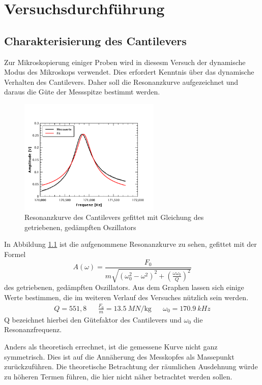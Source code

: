 \chapter{Versuchsdurchführung}

    \section{Charakterisierung des Cantilevers}

Zur Mikroskopierung einiger Proben wird in diesesm Versuch der dynamische Modus des
Mikroskops verwendet. Dies erfordert Kenntnis über das dynamische Verhalten des 
Cantilevers. Daher soll die Resonanzkurve aufgezeichnet und daraus die Güte der
Messspitze bestimmt werden. \par
\begin{figure}[hb]
    \centering
    \includegraphics[width=0.6\textwidth]{Mess/freqsweep_2.pdf}
    \caption{Resonanzkurve des Cantilevers gefittet mit Gleichung des getriebenen,
             gedämpften Oszillators}
    \label{freqsweep}
\end{figure}
In Abbildung \ref{freqsweep} ist die aufgenommene Resonanzkurve zu sehen, gefittet
mit der Formel
\[
    A(\omega) = \frac{F_0}{m \sqrt{(\omega_0^2 - \omega^2)^2 + \left( 
    \frac{\omega\omega_0}{Q} \right)^2} }
\]
des getriebenen, gedämpften Oszillators. Aus dem Graphen lassen sich einige Werte
bestimmen, die im weiteren Verlauf des Versuches nützlich sein werden.
\begin{align*}
    Q=551,8 & & \frac{F_0}{m} = \SI{13,5}{MN\per\kg} & & \omega_0 =
    \SI{170,9}{kHz}
\end{align*}
Q bezeichnet hierbei den Gütefaktor des Cantilevers und $\omega_0$ die 
Resonanzfrequenz. \par
Anders als theoretisch errechnet, ist die gemessene Kurve nicht ganz symmetrisch.
Dies ist auf die Annäherung des Messkopfes als Massepunkt zurückzuführen. Die 
theoretische Betrachtung der räumlichen Ausdehnung würde zu höheren Termen führen,
die hier nicht näher betrachtet werden sollen.

